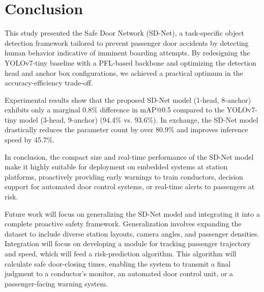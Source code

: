 \documentclass[journal,twoside,web]{ieeecolor}
\begin{document}
\section{Conclusion}
This study presented the Safe Door Network (\ac{SD-Net}), a 
task-specific object detection framework tailored to prevent 
passenger door accidents by detecting human behavior 
indicative of imminent boarding attempts. By redesigning the 
\ac{YOLO}v7-tiny baseline with a \ac{PFL}-based backbone and 
optimizing the detection head and anchor box configurations, 
we achieved a practical optimum in the accuracy-efficiency 
trade-off.

Experimental results show that the proposed \ac{SD-Net} model 
(1-head, 8-anchor) exhibits only a marginal 0.8\% difference 
in \ac{mAP}@0.5 compared to the \ac{YOLO}v7-tiny model 
(3-head, 9-anchor) (94.4\% vs. 93.6\%). In exchange, the 
\ac{SD-Net} model drastically reduces the parameter count by 
over 80.9\% and improves inference speed by 45.7\%.

In conclusion, the compact size and real-time performance of 
the \ac{SD-Net} model make it highly suitable for deployment 
on embedded systems at station platforms, proactively providing early warnings to train conductors, decision 
support for automated door control systems, or real-time alerts to passengers at risk.

Future work will focus on generalizing the \ac{SD-Net} model and integrating it into a complete proactive safety framework. 
Generalization involves expanding the dataset to include diverse station layouts, camera angles, and passenger densities. 
Integration will focus on developing a module for tracking passenger trajectory and speed, which will feed a 
risk-prediction algorithm. This algorithm will calculate safe door-closing times, enabling the system to 
transmit a final judgment to a conductor's monitor, an automated door control unit, or a passenger-facing warning system.



\end{document}
